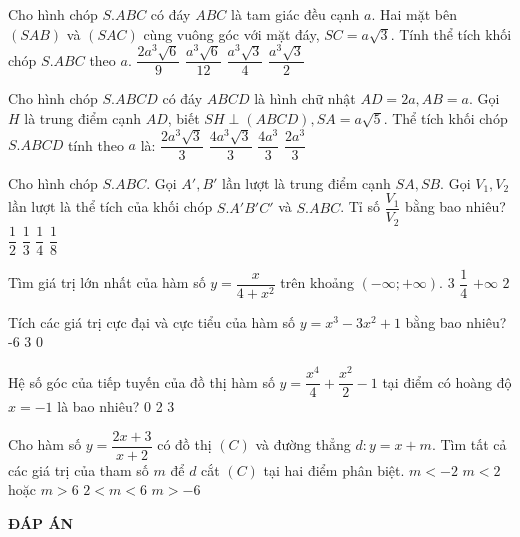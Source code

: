\begin{ex}%
Cho hình chóp $S.ABC$ có đáy $ABC$ là tam giác đều cạnh $a$. Hai mặt bên $(SAB)$ và $(SAC)$ cùng vuông góc với mặt đáy, $SC=a\sqrt{3}$. Tính thể tích khối chóp $S.ABC$
 theo $a$.
\choice
{$\dfrac{2a^3\sqrt{6}}{9}$}
{\True $\dfrac{a^3\sqrt{6}}{12}$}
{$\dfrac{a^3\sqrt{3}}{4}$}
{$\dfrac{a^3\sqrt{3}}{2}$}
\end{ex}\begin{ex}
Cho hình chóp $S.ABCD$ có đáy $ABCD$ là hình chữ nhật $AD=2a,AB=a$. Gọi $H$ là trung điểm cạnh $AD$, biết $SH\perp (ABCD),SA=a\sqrt{5}$. Thể tích khối chóp $S.ABCD$ tính theo $a$ là:
\choice
{$\dfrac{2a^3\sqrt{3}}{3}$}
{$\dfrac{4a^3\sqrt{3}}{3}$}
{\True $\dfrac{4a^3}{3}$}
{$\dfrac{2a^3}{3}$}
\end{ex}\begin{ex}
Cho hình chóp $S.ABC$. Gọi $A',B'$ lần lượt là trung điểm cạnh $SA,SB$. Gọi $V_1,V_2$ lần lượt là thể tích của khối chóp $S.A'B'C'$ và $S.ABC$. Tỉ số $\dfrac{V_1}{V_2}$ bằng bao nhiêu?
\choice
{$\dfrac{1}{2}$}
{$\dfrac{1}{3}$}
{\True $\dfrac{1}{4}$}
{$\dfrac{1}{8}$}
\end{ex}\begin{ex}
Tìm giá trị lớn nhất của hàm số $y=\dfrac{x}{4+x^2}$ trên khoảng $(-\infty;+\infty)$.
\choice
{$3$}
{\True $\dfrac{1}{4}$}
{$+\infty$}
{$2$}
\end{ex}
\begin{ex}%
Tích các giá trị cực đại và cực tiểu của hàm số $y=x^3-3x^2+1$ bằng bao nhiêu?
\choice
{}
{-6}
{3}
{0}
\end{ex}
\begin{ex}%
Hệ số góc của tiếp tuyến của đồ thị hàm số $y=\dfrac{x^4}{4}+\dfrac{x^2}{2}-1$ tại điểm có hoàng độ $x=-1$ là bao nhiêu?
\choice
{0}
{2}
{}
{3}
\end{ex}
\begin{ex}%
	Cho hàm số $y =\dfrac{2x+3}{x+2}$ có đồ thị $(C)$ và đường thẳng $ d:y=x+m $. Tìm tất cả các giá trị của tham số $ m $ để $ d $ cắt $ (C) $ tại hai điểm phân biệt.
	\choice
	{$ m<-2 $}
	{\True $ m<2$ hoặc $ m>6 $}
	{$ 2<m<6 $}
	{$ m>-6 $}
\end{ex}
\newpage
\begin{center}
	\textbf{ĐÁP ÁN}
\end{center}
\begin{multicols}{10}
	 
\end{multicols}
